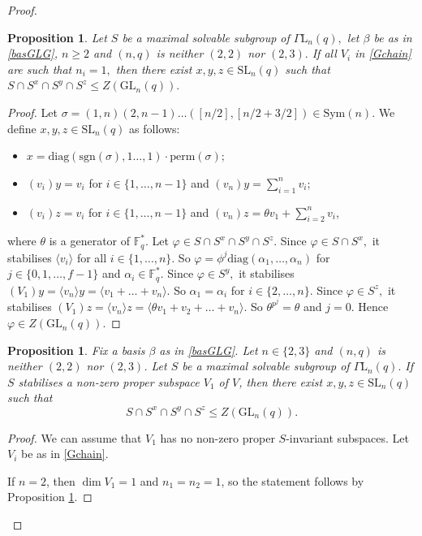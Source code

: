 \documentclass[a4paper,reqno,11pt]{amsart}
\newtheorem{Prop}[Th]{Proposition}
\theoremstyle{definition}
\theoremstyle{remark}
\numberwithin{equation}{section}
\newcommand{\Sym}{\mathrm{Sym}}
\newcommand{\diag}{\mathrm{diag}}
\newcommand{\sgn}{\mathrm{sgn}}
\newcommand{\per}{\mathrm{perm}}
\newcommand{\GaL}{{\Gamma \mathrm{L}}}
\newcommand{\SL}{{\mathrm{SL}}}
\newcommand{\GL}{{\mathrm{GL}}}
\begin{document}
\begin{proof}
\begin{Prop}
\label{ni1}
Let $S$ be a maximal solvable subgroup of $\GaL_n(q),$ let $\beta$ be as in \eqref{basGLG},  $n \ge 2$ and $(n,q)$ is neither $(2,2)$ nor $(2,3).$ If  all $V_i$ in \eqref{Gchain} are such that $n_i=1,$ then there exist $x,y,z \in \SL_n(q)$ such that $S \cap S^x \cap S^y \cap S^z \le Z(\GL_n(q)).$ 
\end{Prop}
\begin{proof}
Let $\sigma =(1, n)(2, n - 1) \ldots ([n/2], [n/2 + 3/2]) \in \Sym(n).$ We define $x,y,z \in \SL_n(q)$ as follows:
\begin{itemize}
 \item $x = \diag(\sgn(\sigma), 1\ldots, 1) \cdot \per (\sigma);$ 
\item $(v_i)y=v_i$ for $i \in \{1, \ldots, n-1\}$ and $(v_n)y= \sum_{i=1}^n v_i$;
\item $(v_i)z=v_i$ for $i \in \{1, \ldots, n-1\}$ and $(v_n)z= \theta v_1 + \sum_{i=2}^n v_i$, 
\end{itemize}
where $\theta$ is a generator of $\mathbb{F}_q^*.$ Let $\varphi \in S \cap S^x \cap S^y \cap S^z.$ Since $\varphi \in S \cap S^x,$ it stabilises $\langle v_i \rangle $ for all $i \in \{1, \ldots, n\}.$ So $\varphi =\phi^j \diag(\alpha_1, \ldots, \alpha_n)$ for $j \in \{0,1, \ldots, f-1\}$ and $\alpha_i \in \mathbb{F}_q^*.$ Since $\varphi \in S^y,$ it stabilises $(V_1)y =\langle v_n \rangle y= \langle v_1 + \ldots +v_n \rangle.$ So $\alpha_1=\alpha_i$ for $i \in \{2, \ldots, n\}.$  Since $\varphi \in S^z,$ it stabilises $(V_1)z =\langle v_n \rangle z= \langle \theta v_1 + v_2 + \ldots +v_n \rangle.$ So $\theta^{p^j}=\theta$ and $j=0.$ Hence $\varphi \in Z(\GL_n(q)).$ 
\end{proof}

\begin{Prop}
\label{n3GL}
Fix a basis $\beta$ as in \eqref{basGLG}. Let $n \in \{2,3\}$ and $(n,q)$ is neither $(2,2)$ nor $(2,3)$. Let $S$ be a maximal solvable subgroup of $\GaL_n(q).$ If $S$ stabilises a  non-zero proper subspace $V_1$ of $V$, then there exist $x,y,z \in \SL_n(q)$ such that 
 $$S \cap S^x \cap S^y \cap S^z \le Z(\GL_n(q)).$$
\end{Prop}
\begin{proof}
We can assume that $V_1$ has no non-zero proper $S$-invariant subspaces. Let $V_i$ be as in \eqref{Gchain}.

If $n=2$, then $\dim V_1=1$ and $n_1=n_2=1$, so the statement follows by Proposition \ref{ni1}.



\end{proof}
\end{proof}
\end{document}

